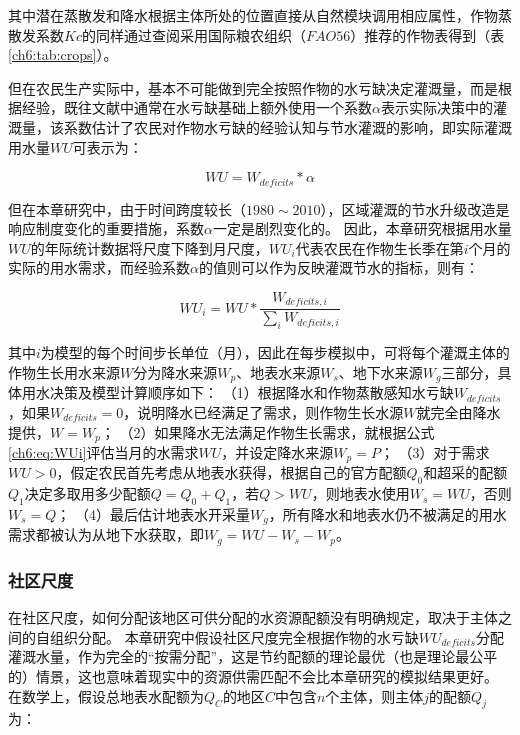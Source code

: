 其中潜在蒸散发和降水根据主体所处的位置直接从自然模块调用相应属性，作物蒸散发系数$Kc$的同样通过查阅采用国际粮农组织（$FAO56$）推荐的作物表得到（表\ref{ch6:tab:crops}）。



但在农民生产实际中，基本不可能做到完全按照作物的水亏缺决定灌溉量，而是根据经验，既往文献中通常在水亏缺基础上额外使用一个系数$\alpha$表示实际决策中的灌溉量，该系数估计了农民对作物水亏缺的经验认知与节水灌溉的影响，即实际灌溉用水量$WU$可表示为：

\begin{equation}
    \label{ch6:eq:WU}
    WU = W_{deficits} * \alpha
\end{equation}

但在本章研究中，由于时间跨度较长（$1980 \sim 2010$），区域灌溉的节水升级改造是响应制度变化的重要措施，系数$\alpha$一定是剧烈变化的。
因此，本章研究根据用水量$WU$的年际统计数据将尺度下降到月尺度，$WU_i$代表农民在作物生长季在第$i$个月的实际的用水需求，而经验系数$\alpha$的值则可以作为反映灌溉节水的指标，则有：

\begin{equation}
    \label{ch6:eq:WUi}
    WU_i = WU * \frac{W_{deficits, i}}{\sum_{i} W_{deficits, i}}
\end{equation}

其中$i$为模型的每个时间步长单位（月），因此在每步模拟中，可将每个灌溉主体的作物生长用水来源$W$分为降水来源$W_p$、地表水来源$W_s$、地下水来源$W_g$三部分，具体用水决策及模型计算顺序如下：
（1）根据降水和作物蒸散感知水亏缺$W_{deficits}$，如果$W_{deficits}=0$，说明降水已经满足了需求，则作物生长水源$W$就完全由降水提供，$W=W_{p}$；
（2）如果降水无法满足作物生长需求，就根据公式\ref{ch6:eq:WUi}评估当月的水需求$WU$，并设定降水来源$W_{p} = P$；
（3）对于需求$WU > 0$，假定农民首先考虑从地表水获得，根据自己的官方配额$Q_{0}$和超采的配额$Q_{1}$决定多取用多少配额$Q = Q_{0} + Q_{1}$，若$Q > WU$，则地表水使用$W_s = WU$，否则$W_s = Q$；
（4）最后估计地表水开采量$W_g$，所有降水和地表水仍不被满足的用水需求都被认为从地下水获取，即$W_g = WU - W_s - W_p$。

\subsubsection*{社区尺度}

在社区尺度，如何分配该地区可供分配的水资源配额没有明确规定，取决于主体之间的自组织分配。
本章研究中假设社区尺度完全根据作物的水亏缺$WU_{deficits}$分配灌溉水量，作为完全的“按需分配”，这是节约配额的理论最优（也是理论最公平的）情景，这也意味着现实中的资源供需匹配不会比本章研究的模拟结果更好。
在数学上，假设总地表水配额为$Q_{C}$的地区$C$中包含$n$个主体，则主体$j$的配额$Q_j$为：

